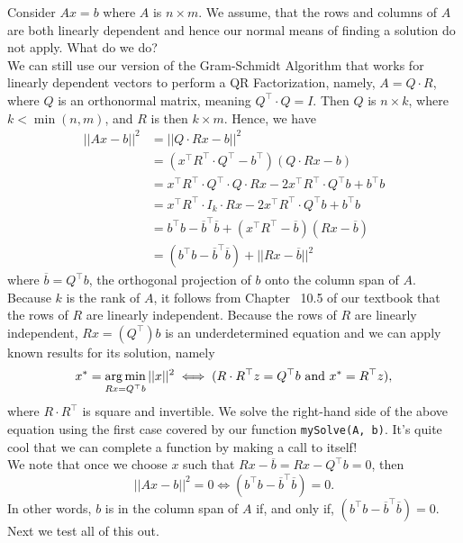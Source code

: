 \begin{tcolorbox}[title=\textbf{\Large Solving $Ax=b$ when neither Rows nor Columns of A are Linearly Independent}]

Consider $Ax=b$ where $A$ is $n \times m$. We assume, that the rows and columns of $A$ are both linearly dependent and hence our normal means of finding a solution do not apply. What do we do?\\

We can still use our version of the Gram-Schmidt Algorithm that works for linearly dependent vectors to perform a QR Factorization, namely, $A=Q \cdot R$, where $Q$ is an orthonormal matrix, meaning $Q^\top \cdot Q = I$. Then $Q$ is $n \times k$, where $k < \min(n, m)$, and $R$ is then $k \times m$. Hence, we have
\begin{align*}
    ||Ax-b||^2 & = ||Q \cdot R x - b||^2 \\
    &= (x^\top R^\top \cdot Q^\top -b^\top) (Q \cdot R x - b ) \\
    &= x^\top R ^\top \cdot Q^\top \cdot Q \cdot R x - 2 x^\top R^\top \cdot Q^\top b + b^\top b\\
    &= x^\top R ^\top \cdot I_{k} \cdot R x - 2 x^\top R^\top \cdot Q^\top b + b^\top b\\
    & = b^\top b - \overline{b}^\top \overline{b} + (x^\top R^\top -\overline{b}) (R x - \overline{b} ) \\
    & = \left( b^\top b - \overline{b}^\top \overline{b} \right) + ||Rx - \overline{b}||^2
\end{align*}
where $\overline{b} = Q^\top b$, the orthogonal projection of $b$ onto the column span of $A$.
Because $k$ is the rank of $A$, it follows from Chapter~ 10.5 of our textbook that the rows of $R$ are linearly independent. Because the rows of $R$ are linearly independent, $ R x = (Q^\top) b$ is an underdetermined equation and we can apply known results for its solution, namely
$$ x^* = \operatorname*{arg\,min}_{R x = Q^\top b} ||x||^2 \iff (R \cdot R^\top z = Q^\top b \text{ and } x^* = R^\top z),$$
where $R \cdot R^\top$ is square and invertible. We solve the right-hand side of the above equation using the first case covered by our function \texttt{mySolve(A, b)}. It's quite cool that we can complete a function by making a call to itself!\\

We note that once we choose $x$ such that $Rx - \overline{b} = Rx - Q^\top b = 0$, then $$||Ax-b||^2 = 0 \iff  \left( b^\top b - \overline{b}^\top \overline{b} \right) = 0.$$
In other words, $b$ is in the column span of $A$ if, and only if, $\left( b^\top b - \overline{b}^\top \overline{b} \right) = 0$.\\

Next we test all of this out.

\end{tcolorbox}

